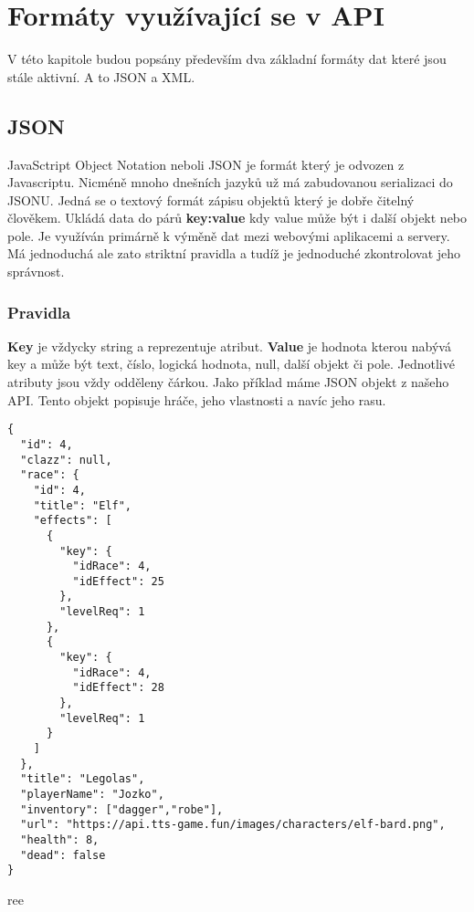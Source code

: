 \chapter{Formáty využívající se v API}
V této kapitole budou popsány především dva základní formáty dat které jsou stále aktivní. A to JSON a XML.

\section{JSON}
JavaSctript Object Notation neboli JSON je formát který je odvozen z Javascriptu. Nicméně mnoho dnešních jazyků už má zabudovanou serializaci do JSONU. Jedná se o textový formát zápisu objektů který je dobře čitelný člověkem. Ukládá data do párů \textbf{key:value} kdy value může být i další objekt nebo pole. Je využíván primárně k výměně dat mezi webovými aplikacemi a servery. Má jednoduchá ale zato striktní pravidla a tudíž je jednoduché zkontrolovat jeho správnost.

\subsection{Pravidla}
\textbf{Key} je vždycky string a reprezentuje atribut. \textbf{Value} je hodnota kterou nabývá key a může být text, číslo, logická hodnota, null, další objekt či pole. Jednotlivé atributy jsou vždy odděleny čárkou. Jako příklad máme JSON objekt z našeho API. Tento objekt popisuje hráče, jeho vlastnosti a navíc jeho rasu.

\newpage

\begin{listing}[]
  \begin{verbatim}
{
  "id": 4,
  "clazz": null,
  "race": {
    "id": 4,
    "title": "Elf",
    "effects": [
      {
        "key": {
          "idRace": 4,
          "idEffect": 25
        },
        "levelReq": 1
      },
      {
        "key": {
          "idRace": 4,
          "idEffect": 28
        },
        "levelReq": 1
      }
    ]
  },
  "title": "Legolas",
  "playerName": "Jozko",
  "inventory": ["dagger","robe"],
  "url": "https://api.tts-game.fun/images/characters/elf-bard.png",
  "health": 8,
  "dead": false
}
  \end{verbatim}
  \caption{ree}
  \label{code:sumaradyasm}
\end{listing}


